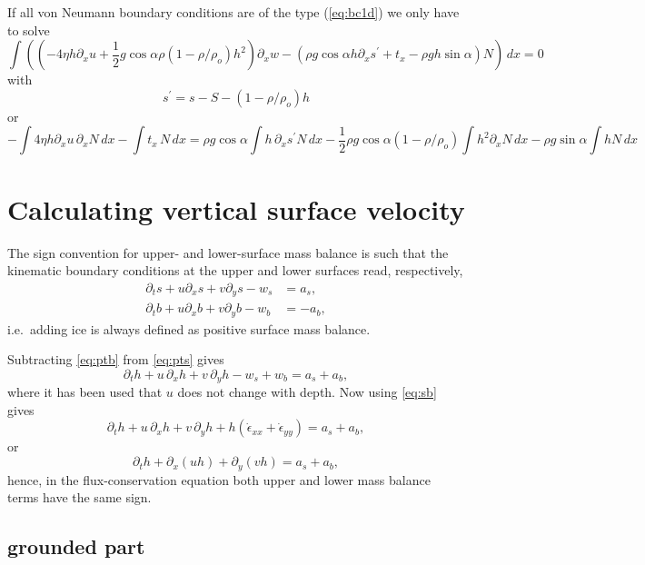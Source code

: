 \documentclass[10pt,a4paper]{book}
\newcommand{\p}{\partial}
\newcommand{\exx}{\dot{\epsilon}_{xx}}
\newcommand{\eyy}{\dot{\epsilon}_{yy}}
\begin{document}
If all von Neumann boundary conditions are of the type (\ref{eq:bc1d}) we only have to solve
\[ 
\int (( -4  \eta h \p_x u +\frac{1}{2} g \cos \alpha \rho (1-\rho/\rho_o)  h^2) \p_x w
 - (\rho g \cos \alpha h \p_x s^{'} + t_x - \rho g h \sin \alpha ) N )\, dx =0
\]
with
\[ s^{'} = s-S-(1-\rho/\rho_o) h\]
or
\[
- \int 4 \eta h \p_x u \, \p_x N \, dx - \int t_x \, N \, dx
=\rho g \cos \alpha \int h \, \p_x s^{'} N \, dx - \frac{1}{2} \rho g \cos \alpha (1-\rho/\rho_o)
\int h^2 \p_x N \, dx 
- \rho g \sin \alpha \int h N \, dx
\]


\appendix



\chapter{Calculating vertical surface velocity}

The sign convention for upper- and lower-surface mass balance is such
that the kinematic boundary conditions at the upper and
lower surfaces read, respectively,
\begin{align} 
\p_t s + u \p_x s +v \p_y s -w_s&=a_s  ,\label{eq:pts} \\
\p_t b + u \p_x b +v \p_y b -w_b&=-a_b ,\label{eq:ptb} 
\end{align}
i.e.\ adding ice is always defined as positive surface mass balance.

Subtracting \eqref{eq:ptb} from \eqref{eq:pts} gives
\[
\p_t h+ u \, \p_x h +v \, \p_y h -w_s + w_b=a_s+a_b ,
\]
where it has been used that $u$ does not change with depth. Now using \eqref{eq:sb} gives
\[
\p_t h+ u \, \p_x h + v \, \p_y h +h ( \exx + \eyy)=a_s+a_b,
\]
or
\begin{equation}
\p_t h+ \p_x (u h) + \p_y ( v h)=a_s+a_b,
\label{eq:conc}
\end{equation}
hence, in the flux-conservation equation both upper and lower mass balance terms have the same sign. 




\section{grounded part}
\end{document}
